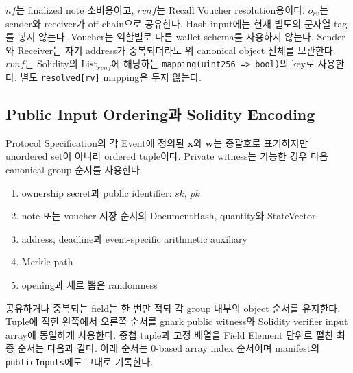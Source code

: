 \documentclass[11pt,a4paper]{extarticle}
\newcommand{\DocumentHash}{\mathrm{DocumentHash}}
\newcommand{\List}[1]{\mathrm{List}_{#1}}
\begin{document}
$nf$는 finalized note 소비용이고, $rvnf$는 Recall Voucher resolution용이다.
$o_{rv}$는 sender와 receiver가 off-chain으로 공유한다. Hash input에는 현재 별도의
문자열 tag를 넣지 않는다. Voucher는 역할별로 다른 wallet schema를 사용하지 않는다.
Sender와 Receiver는 자기 address가 중복되더라도 위 canonical object 전체를 보관한다.
$rvnf$는 Solidity의 $\List{rvnf}$에 해당하는
\texttt{mapping(uint256 => bool)}의 key로 사용한다. 별도
\texttt{resolved[rv]} mapping은 두지 않는다.

\subsection{Public Input Ordering과 Solidity Encoding}

Protocol Specification의 각 Event에 정의된 $\mathbf{x}$와 $\mathbf{w}$는 중괄호로
표기하지만 unordered set이 아니라 ordered tuple이다.
Private witness는 가능한 경우 다음 canonical group 순서를 사용한다.

\begin{enumerate}[nosep]
  \item ownership secret과 public identifier: $sk$, $pk$
  \item note 또는 voucher 저장 순서의 $\DocumentHash$, quantity와 StateVector
  \item address, deadline과 event-specific arithmetic auxiliary
  \item Merkle path
  \item opening과 새로 뽑은 randomness
\end{enumerate}

공유하거나 중복되는 field는 한 번만 적되 각 group 내부의 object 순서를 유지한다.
Tuple에 적힌 왼쪽에서 오른쪽 순서를 gnark public witness와 Solidity verifier input
array에 동일하게 사용한다. 중첩 tuple과 고정 배열을 Field Element 단위로 펼친 최종
순서는 다음과 같다. 아래 순서는 0-based array index 순서이며 manifest의
\texttt{publicInputs}에도 그대로 기록한다.
\end{document}
